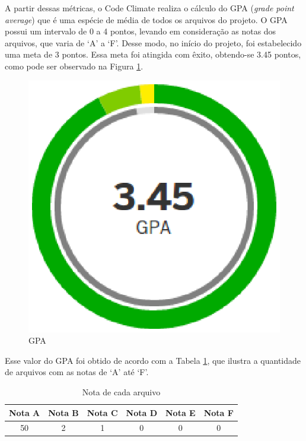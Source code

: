 A partir dessas métricas, o Code Climate realiza o cálculo do GPA (\textit{grade point average}) que é uma espécie de média de todos os arquivos do projeto. O GPA possui um intervalo de 0 a 4 pontos, levando em consideração as notas dos arquivos, que varia de `A' a `F'. Desse modo, no início do projeto, foi estabelecido uma meta de 3 pontos. Essa meta foi atingida com êxito, obtendo-se 3.45 pontos, como pode ser observado na Figura \ref{GPA}.

\begin{figure}[!h]
	\centering
	\includegraphics[scale=0.5]{figuras/resultados/gpa.eps}
	\caption[GPA]{GPA}
	\label{GPA}
\end{figure}

Esse valor do GPA foi obtido de acordo com a Tabela \ref{gpa_arquivos}, que ilustra a quantidade de arquivos com as notas de `A' até `F'.

\begin{table}[!h]
\centering
\caption{Nota de cada arquivo}
\label{gpa_arquivos}
\begin{tabular}{cccccc}
\toprule
\textbf{Nota A} & \textbf{Nota B} & \textbf{Nota C} & \textbf{Nota D} & \textbf{Nota E} & \textbf{Nota F} \\ \midrule
50 & 2 & 1 & 0 & 0 & 0							   \\ \bottomrule
\end{tabular}
\end{table}

